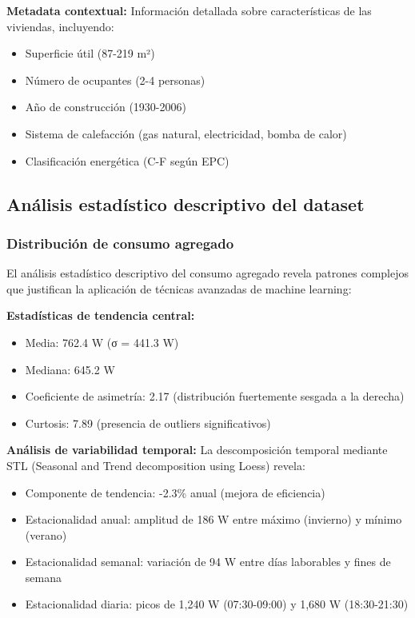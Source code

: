 \textbf{Metadata contextual:} Información detallada sobre características de las viviendas, incluyendo:
\begin{itemize}
    \item Superficie útil (87-219 m²)
    \item Número de ocupantes (2-4 personas)
    \item Año de construcción (1930-2006)
    \item Sistema de calefacción (gas natural, electricidad, bomba de calor)
    \item Clasificación energética (C-F según EPC)
\end{itemize}

\subsection{Análisis estadístico descriptivo del dataset}

\subsubsection{Distribución de consumo agregado}

El análisis estadístico descriptivo del consumo agregado revela patrones complejos que justifican la aplicación de técnicas avanzadas de machine learning:

\textbf{Estadísticas de tendencia central:}
\begin{itemize}
    \item Media: 762.4 W (σ = 441.3 W)
    \item Mediana: 645.2 W
    \item Coeficiente de asimetría: 2.17 (distribución fuertemente sesgada a la derecha)
    \item Curtosis: 7.89 (presencia de outliers significativos)
\end{itemize}

\textbf{Análisis de variabilidad temporal:}
La descomposición temporal mediante STL (Seasonal and Trend decomposition using Loess) revela:
\begin{itemize}
    \item Componente de tendencia: -2.3\% anual (mejora de eficiencia)
    \item Estacionalidad anual: amplitud de 186 W entre máximo (invierno) y mínimo (verano)
    \item Estacionalidad semanal: variación de 94 W entre días laborables y fines de semana
    \item Estacionalidad diaria: picos de 1,240 W (07:30-09:00) y 1,680 W (18:30-21:30)
\end{itemize}

